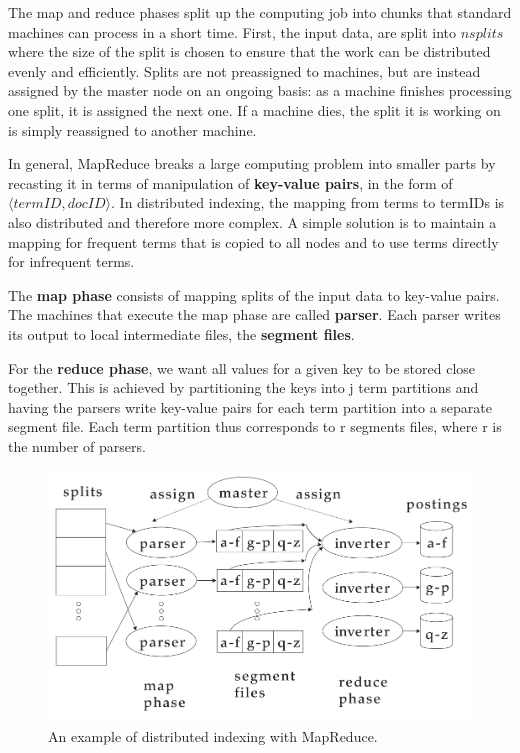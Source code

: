 \documentclass[letterpaper,11pt]{article}
\begin{document}
The map and reduce phases split up the computing job into chunks that standard machines can process in a short time. First, the input data, are split into $n splits$ where the size of the split is chosen to ensure that the work can be distributed evenly and efficiently. Splits are not preassigned to machines, but are instead assigned by the master node on an ongoing basis: as a machine finishes processing one split, it is assigned the next one. If a machine dies, the split it is working on is simply reassigned to another machine.

In general, MapReduce breaks a large computing problem into smaller parts by recasting it in terms of manipulation of \textbf{key-value pairs}, in the form of $\langle termID, docID \rangle$. In distributed indexing, the mapping from terms to termIDs is also distributed and therefore more complex. A simple solution is to maintain a mapping for frequent terms that is copied to all nodes and to use terms directly for infrequent terms.

The\textbf{ map phase} consists of mapping splits of the input data to key-value pairs. The machines that execute the map phase are called \textbf{parser}. Each parser writes its output to local intermediate files, the \textbf{segment files}.

For the \textbf{reduce phase}, we want all values for a given key to be stored close together. This is achieved by partitioning the keys into j term partitions and having the parsers write key-value pairs for each term partition into a separate segment file. Each term partition thus corresponds to r segments files, where r is the number of parsers.

\begin{figure}[H]
    \centering
    \includegraphics[scale=0.40]{sect4/figure_4_5.png}
    \caption{An example of distributed indexing with MapReduce.}
\end{figure}
\end{document}
